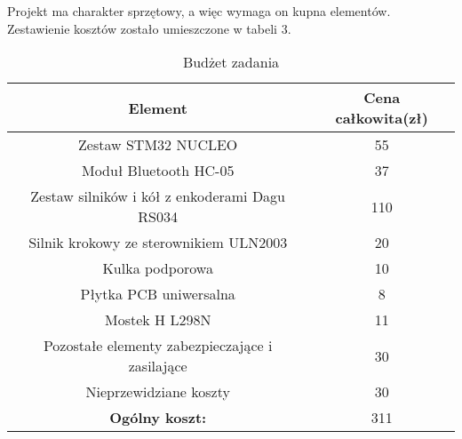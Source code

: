 Projekt ma charakter sprzętowy, a więc wymaga on kupna elementów. Zestawienie kosztów zostało umieszczone w tabeli 3.


\begin{table}[!htbp]
\begin{center}
\begin{tabular}{|c|c|}
\hline
\textbf{Element} & \textbf{Cena całkowita(zł)} \\ \hline\hline
Zestaw STM32 NUCLEO & 55 \\ \hline
Moduł Bluetooth HC-05 & 37 \\ \hline
Zestaw silników i kół z enkoderami Dagu RS034 & 110 \\ \hline
Silnik krokowy ze sterownikiem ULN2003 & 20 \\ \hline
Kulka podporowa & 10 \\ \hline
Płytka PCB uniwersalna & 8 \\ \hline
Mostek H L298N & 11 \\ \hline
Pozostałe elementy zabezpieczające i zasilające & 30 \\ \hline
Nieprzewidziane koszty & 30 \\ \hline\hline
\textbf{Ogólny koszt:} & 311 \\ \hline

\end{tabular}
\caption{Budżet zadania}
\end{center}
\end{table}

